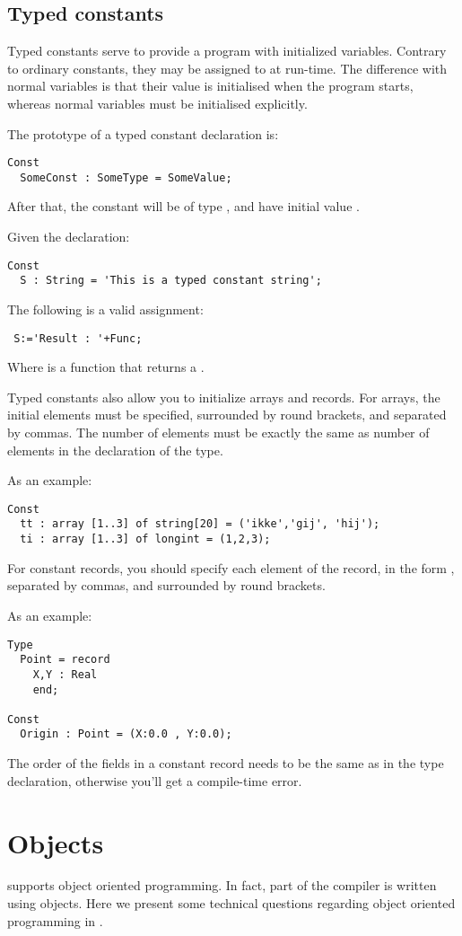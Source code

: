 \documentclass{report}
\begin{document}
\subsection{Typed constants}
Typed constants serve to provide a program with initialized variables.
Contrary to ordinary constants, they may be assigned to at run-time.
The difference with normal variables is that their value is initialised
when the program starts, whereas normal variables must be initialised
explicitly.

The prototype of a typed constant declaration is:
\begin{verbatim}
Const
  SomeConst : SomeType = SomeValue;
\end{verbatim}
After that, the constant  will be of type , and
have initial value .

Given the declaration:
\begin{verbatim}
Const
  S : String = 'This is a typed constant string';
\end{verbatim}
The following is a valid assignment:
\begin{verbatim}
 S:='Result : '+Func;
\end{verbatim}
Where  is a function that returns a .

Typed constants also allow you to initialize arrays and records. For arrays,
the initial elements must be specified, surrounded by round brackets, and
separated by commas. The number of elements must be exactly the same as
number of elements in the declaration of the type. 

As an example:
\begin{verbatim}
Const 
  tt : array [1..3] of string[20] = ('ikke','gij', 'hij');
  ti : array [1..3] of longint = (1,2,3);
\end{verbatim}

For constant records, you should specify each element of the record, in the
form , separated by commas, and surrounded by round
brackets.

As an example:
\begin{verbatim}
Type 
  Point = record
    X,Y : Real
    end;

Const
  Origin : Point = (X:0.0 , Y:0.0); 
\end{verbatim}
The order of the fields in a constant record needs to be the same as in the type declaration,
otherwise you'll get a compile-time error.

\section{Objects}
\fpk supports object oriented programming. In fact, part of the compiler is
written using objects. Here we present some technical questions regarding
object oriented programming in \fpk.
\end{document}
